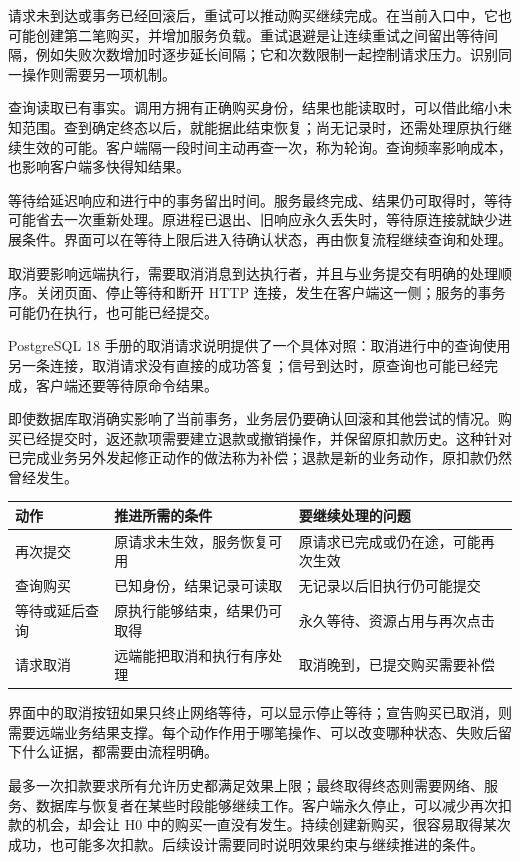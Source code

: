请求未到达或事务已经回滚后，重试可以推动购买继续完成。在当前入口中，它也可能创建第二笔购买，并增加服务负载。重试退避是让连续重试之间留出等待间隔，例如失败次数增加时逐步延长间隔；它和次数限制一起控制请求压力。识别同一操作则需要另一项机制。

查询读取已有事实。调用方拥有正确购买身份，结果也能读取时，可以借此缩小未知范围。查到确定终态以后，就能据此结束恢复；尚无记录时，还需处理原执行继续生效的可能。客户端隔一段时间主动再查一次，称为轮询。查询频率影响成本，也影响客户端多快得知结果。

等待给延迟响应和进行中的事务留出时间。服务最终完成、结果仍可取得时，等待可能省去一次重新处理。原进程已退出、旧响应永久丢失时，等待原连接就缺少进展条件。界面可以在等待上限后进入待确认状态，再由恢复流程继续查询和处理。

取消要影响远端执行，需要取消消息到达执行者，并且与业务提交有明确的处理顺序。关闭页面、停止等待和断开 HTTP 连接，发生在客户端这一侧；服务的事务可能仍在执行，也可能已经提交。



PostgreSQL 18 手册的取消请求说明提供了一个具体对照：取消进行中的查询使用另一条连接，取消请求没有直接的成功答复；信号到达时，原查询也可能已经完成，客户端还要等待原命令结果\cite{pg}。

即使数据库取消确实影响了当前事务，业务层仍要确认回滚和其他尝试的情况。购买已经提交时，返还款项需要建立退款或撤销操作，并保留原扣款历史。这种针对已完成业务另外发起修正动作的做法称为补偿；退款是新的业务动作，原扣款仍然曾经发生。

\begin{center}
\begin{minipage}{\linewidth}
\centering\small\captionsetup{hypcap=false}
\begin{tabularx}{\linewidth}{p{.19\linewidth}XX}
\toprule
\textbf{动作} & \textbf{推进所需的条件} & \textbf{要继续处理的问题} \\
\midrule
再次提交 & 原请求未生效，服务恢复可用 & 原请求已完成或仍在途，可能再次生效 \\
查询购买 & 已知身份，结果记录可读取 & 无记录以后旧执行仍可能提交 \\
等待或延后查询 & 原执行能够结束，结果仍可取得 & 永久等待、资源占用与再次点击 \\
请求取消 & 远端能把取消和执行有序处理 & 取消晚到，已提交购买需要补偿 \\
\bottomrule
\end{tabularx}
\end{minipage}
\end{center}

界面中的取消按钮如果只终止网络等待，可以显示停止等待；宣告购买已取消，则需要远端业务结果支撑。每个动作作用于哪笔操作、可以改变哪种状态、失败后留下什么证据，都需要由流程明确。

最多一次扣款要求所有允许历史都满足效果上限；最终取得终态则需要网络、服务、数据库与恢复者在某些时段能够继续工作。客户端永久停止，可以减少再次扣款的机会，却会让 H0 中的购买一直没有发生。持续创建新购买，很容易取得某次成功，也可能多次扣款。后续设计需要同时说明效果约束与继续推进的条件。
\FloatBarrier
